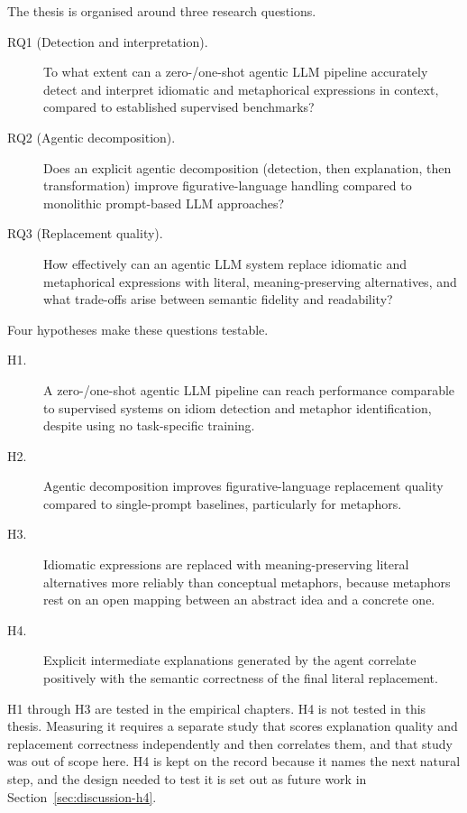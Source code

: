 The thesis is organised around three research questions.

\begin{description}
  \item[RQ1 (Detection and interpretation).] To what extent can a
    zero-/one-shot agentic LLM pipeline accurately detect and interpret
    idiomatic and metaphorical expressions in context, compared to established
    supervised benchmarks?
  \item[RQ2 (Agentic decomposition).] Does an explicit agentic decomposition
    (detection, then explanation, then transformation) improve
    figurative-language handling compared to monolithic prompt-based LLM
    approaches?
  \item[RQ3 (Replacement quality).] How effectively can an agentic LLM system
    replace idiomatic and metaphorical expressions with literal,
    meaning-preserving alternatives, and what trade-offs arise between semantic
    fidelity and readability?
\end{description}

Four hypotheses make these questions testable.

\begin{description}
  \item[H1.] A zero-/one-shot agentic LLM pipeline can reach performance
    comparable to supervised systems on idiom detection and metaphor
    identification, despite using no task-specific training.
  \item[H2.] Agentic decomposition improves figurative-language replacement
    quality compared to single-prompt baselines, particularly for metaphors.
  \item[H3.] Idiomatic expressions are replaced with meaning-preserving literal
    alternatives more reliably than conceptual metaphors, because metaphors
    rest on an open mapping between an abstract idea and a concrete one.
  \item[H4.] Explicit intermediate explanations generated by the agent
    correlate positively with the semantic correctness of the final literal
    replacement.
\end{description}

H1 through H3 are tested in the empirical chapters. H4 is not tested in this
thesis. Measuring it requires a separate study that scores explanation quality
and replacement correctness independently and then correlates them, and that
study was out of scope here. H4 is kept on the record because it names the next
natural step, and the design needed to test it is set out as future work in
Section~\ref{sec:discussion-h4}.

